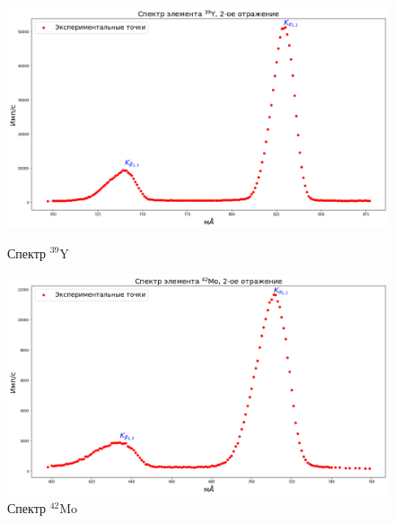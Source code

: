 \documentclass[a4paper, 12pt]{article}%
\begin{document}
		\begin{figure}[h!]
			\begin{minipage}[h]{0.49\textwidth}
				\begin{center}
					\includegraphics[width=1.02\linewidth]{Спектры/y.png}
					\caption{Спектр $^{39}$Y}
				\end{center}
			\end{minipage}
			\hfill
			\begin{minipage}[h]{0.49\textwidth}
				\begin{center}
					\includegraphics[width=1.02\linewidth]{Спектры/Mo.png}
					\caption{Спектр $^{42}$Mo}
				\end{center}
			\end{minipage}
		\end{figure}
\end{document}
